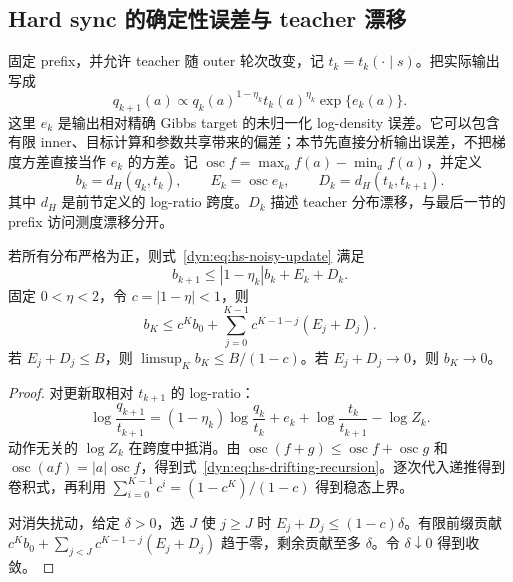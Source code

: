 \subsection{Hard sync 的确定性误差与 teacher 漂移}
\label{dyn:sec:hs-noise}

固定 prefix，并允许 teacher 随 outer 轮次改变，记 $t_k=t_k(\cdot\mid s)$。把实际输出写成
\begin{equation}\label{dyn:eq:hs-noisy-update}
 q_{k+1}(a)\propto q_k(a)^{1-\eta_k}t_k(a)^{\eta_k}
             \exp\{e_k(a)\}.
\end{equation}
这里 $e_k$ 是输出相对精确 Gibbs target 的未归一化 log-density 误差。它可以包含有限 inner、目标计算和参数共享带来的偏差；本节先直接分析输出误差，不把梯度方差直接当作 $e_k$ 的方差。记 $\operatorname{osc}f=\max_a f(a)-\min_a f(a)$，并定义
\begin{equation*}
 b_k=d_H(q_k,t_k),\qquad E_k=\operatorname{osc}e_k,
 \qquad D_k=d_H(t_k,t_{k+1}).
\end{equation*}
其中 $d_H$ 是前节定义的 log-ratio 跨度。$D_k$ 描述 teacher 分布漂移，与最后一节的 prefix 访问测度漂移分开。

\begin{theorem}\label{dyn:thm:hs-input-state}
若所有分布严格为正，则式~\eqref{dyn:eq:hs-noisy-update} 满足
\begin{equation}\label{dyn:eq:hs-drifting-recursion}
 b_{k+1}\leq |1-\eta_k|b_k+E_k+D_k.
\end{equation}
固定 $0<\eta<2$，令 $c=|1-\eta|<1$，则
\begin{equation*}
 b_K\leq c^K b_0+\sum_{j=0}^{K-1}c^{K-1-j}(E_j+D_j).
\end{equation*}
若 $E_j+D_j\leq B$，则 $\limsup_K b_K\leq B/(1-c)$。若 $E_j+D_j\to0$，则 $b_K\to0$。
\end{theorem}

\begin{proof}
对更新取相对 $t_{k+1}$ 的 log-ratio：
\begin{equation*}
 \log\frac{q_{k+1}}{t_{k+1}}
 =(1-\eta_k)\log\frac{q_k}{t_k}+e_k
       +\log\frac{t_k}{t_{k+1}}-\log Z_k.
\end{equation*}
动作无关的 $\log Z_k$ 在跨度中抵消。由 $\operatorname{osc}(f+g)\leq\operatorname{osc}f+\operatorname{osc}g$ 和 $\operatorname{osc}(af)=|a|\operatorname{osc}f$，得到式~\eqref{dyn:eq:hs-drifting-recursion}。逐次代入递推得到卷积式，再利用 $\sum_{i=0}^{K-1}c^i=(1-c^K)/(1-c)$ 得到稳态上界。

对消失扰动，给定 $\delta>0$，选 $J$ 使 $j\geq J$ 时 $E_j+D_j\leq(1-c)\delta$。有限前缀贡献 $c^Kb_0+\sum_{j<J}c^{K-1-j}(E_j+D_j)$ 趋于零，剩余贡献至多 $\delta$。令 $\delta\downarrow0$ 得到收敛。
\end{proof}


